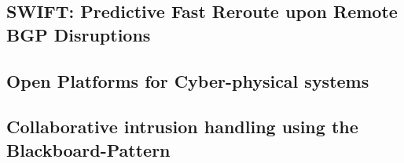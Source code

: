 \subsection{SWIFT: Predictive Fast Reroute upon Remote BGP Disruptions}


\subsection{Open Platforms for Cyber-physical systems}


\subsection{Collaborative intrusion handling using the Blackboard-Pattern}


